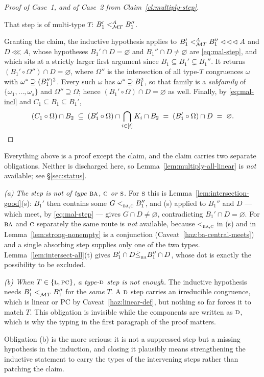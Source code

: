 \begin{proof}[Proof of Case~1, and of Case~2 from Claim~\ref{cl:multiply-step}]
\begin{claim}\label{cl:multiply-step}
That step is of multi-type $T$: $B_{1}'\subt[A]{\MT T}B_{1}''$.
\end{claim}

Granting the claim, the inductive hypothesis applies to
$B_{1}'\subt[A]{\MT T}B_{1}''\lll A$ and $D\lll A$, whose hypotheses
$B_{1}'\cap D=\varnothing$ and $B_{1}''\cap D\neq\varnothing$ are
\eqref{eq:mal-step}, and which sits at a strictly larger first argument since
$B_{1}\subseteq B_{1}'\subsetneq B_{1}''$. It returns
$(B_{1}'\circ\Omega'')\cap D=\varnothing$, where $\Omega''$ is the intersection
of all type-$T$ congruences $\omega$ with $\cover{\omega}\supseteq
(B_{1}'')^{2}$. Every such $\omega$ has $\cover{\omega}\supseteq B_{1}^{2}$,
so that family is a \emph{subfamily} of $\{\omega_{1},\dots,\omega_{s}\}$ and
$\Omega''\supseteq\Omega$; hence $(B_{1}'\circ\Omega)\cap D=\varnothing$ as
well. Finally, by \eqref{eq:mal-incl} and $C_{1}\subseteq B_{1}\subseteq
B_{1}'$,
\[
  (C_{1}\circ\Omega)\cap B_{2}\;\subseteq\;
  (B_{1}'\circ\Omega)\cap\bigcap_{i\in[t]}K_{i}\cap B_{2}\;=\;
  (B_{1}'\circ\Omega)\cap D\;=\;\varnothing . \qedhere
\]
\end{proof}

\begin{hazard}\label{haz:multiply-citation}
Everything above is a proof except the claim, and the claim carries two
separate obligations. Neither is discharged here, so
Lemma~\ref{lem:multiply-all-linear} is \emph{not} available; see
\S\ref{sec:status}.

\emph{(a) The step is not of type $\TBA$, $\TC$ or $\TS$.} For $\TS$ this is
Lemma~\ref{lem:intersection-good}(s): $B_{1}'$ then contains some
$G\subt{\TBA,\TC}B_{1}''$, and (s) applied to $B_{1}''$ and $D$ --- which meet,
by \eqref{eq:mal-step} --- gives $G\cap D\neq\varnothing$, contradicting
$B_{1}'\cap D=\varnothing$. For $\TBA$ and $\TC$ separately the same route is
\emph{not} available, because $\subt{\TBA,\TC}$ in (s) and in
Lemma~\ref{lem:strong-nonempty} is a conjunction
(Caveat~\ref{haz:ba-central-meets}) and a single absorbing step supplies only
one of the two types. Lemma~\ref{lem:intersect-all}(t) gives
$B_{1}'\cap D\dsubte{\TBA}B_{1}''\cap D$, whose dot is exactly the possibility
to be excluded.

\emph{(b) When $T\in\{\TL,\TPC\}$, a type-$\TD$ step is not enough.} The
inductive hypothesis needs $B_{1}'\subt{\MT T}B_{1}''$ for the \emph{same} $T$.
A $\TD$ step carries an irreducible congruence, which is linear or PC by
Caveat~\ref{haz:linear-def}, but nothing so far forces it to match $T$. This
obligation is invisible while the components are written as $\TD$, which is why
the typing in the first paragraph of the proof matters.

Obligation (b) is the more serious: it is not a suppressed step but a missing
hypothesis in the induction, and closing it plausibly means strengthening the
inductive statement to carry the types of the intervening steps rather than
patching the claim.
\end{hazard}

